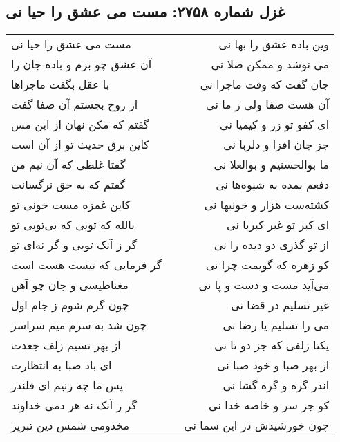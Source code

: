 \begin{center}
\section*{غزل شماره ۲۷۵۸: مست می عشق را حیا نی}
\label{sec:2758}
\begin{longtable}{l p{0.5cm} r}
مست می عشق را حیا نی
&&
وین باده عشق را بها نی
\\
آن عشق چو بزم و باده جان را
&&
می نوشد و ممکن صلا نی
\\
با عقل بگفت ماجراها
&&
جان گفت که وقت ماجرا نی
\\
از روح بجستم آن صفا گفت
&&
آن هست صفا ولی ز ما نی
\\
گفتم که مکن نهان از این مس
&&
ای کفو تو زر و کیمیا نی
\\
کاین برق حدیث تو از آن است
&&
جز جان افزا و دلربا نی
\\
گفتا غلطی که آن نیم من
&&
ما بوالحسنیم و بوالعلا نی
\\
گفتم که به حق نرگسانت
&&
دفعم بمده به شیوه‌ها نی
\\
کاین غمزه مست خونی تو
&&
کشته‌ست هزار و خونبها نی
\\
بالله که تویی که بی‌تویی تو
&&
ای کبر تو غیر کبریا نی
\\
گر ز آنک تویی و گر نه‌ای تو
&&
از تو گذری دو دیده را نی
\\
گر فرمایی که نیست هست است
&&
کو زهره که گویمت چرا نی
\\
مغناطیسی و جان چو آهن
&&
می‌آید مست و دست و پا نی
\\
چون گرم شوم ز جام اول
&&
غیر تسلیم در قضا نی
\\
چون شد به سرم میم سراسر
&&
می را تسلیم یا رضا نی
\\
از بهر نسیم زلف جعدت
&&
یکتا زلفی که جز دو تا نی
\\
ای باد صبا به انتظارت
&&
از بهر صبا و خود صبا نی
\\
پس ما چه زنیم ای قلندر
&&
اندر گره و گره گشا نی
\\
گر ز آنک نه هر دمی خداوند
&&
کو جز سر و خاصه خدا نی
\\
مخدومی شمس دین تبریز
&&
چون خورشیدش در این سما نی
\\
\end{longtable}
\end{center}
